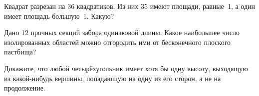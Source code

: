 ﻿
\begin{itemize}

\itA Квадрат разрезан на 36 квадратиков. Из них 35 имеют площади, равные~1, а один имеет площадь большую~1. Какую?

\itB Дано 12 прочных секций забора одинаковой длины. Какое наибольшее число изолированных областей можно отгородить ими от бесконечного плоского пастбища?

\itC Докажите, что любой четырёхугольник имеет хотя бы одну высоту, выходящую из какой-нибудь вершины, попадающую на одну из его сторон, а не на продолжение.
\end{itemize}